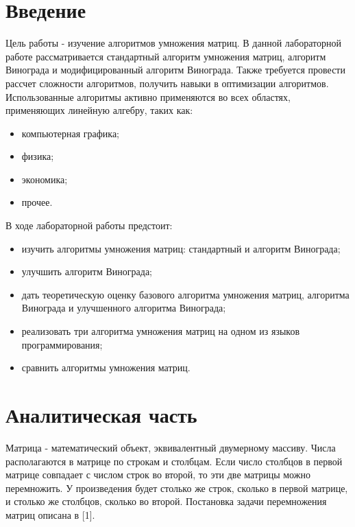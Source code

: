 \documentclass[12pt]{report}
\begin{document}



\tableofcontents

\newpage
\chapter*{Введение}
Цель работы - изучение алгоритмов умножения матриц. В данной лабораторной работе рассматривается стандартный алгоритм умножения матриц, алгоритм Винограда и модифицированный алгоритм Винограда. Также требуется провести рассчет сложности алгоритмов, получить навыки в оптимизации алгоритмов.
Использованные алгоритмы активно применяются во всех областях, применяющих линейную алгебру, таких как:
\begin{itemize}
	\item компьютерная графика;
	\item физика;
	\item экономика;
	\item прочее.
\end{itemize}

В ходе лабораторной работы предстоит:
\begin{itemize}
	\item изучить алгоритмы умножения матриц: стандартный и алгоритм Винограда;
	\item улучшить алгоритм Винограда;
	\item дать теоретическую оценку базового алгоритма умножения матриц, алгоритма Винограда и улучшенного алгоритма Винограда;
	\item реализовать три алгоритма умножения матриц на одном из языков программирования;
	\item сравнить алгоритмы умножения матриц.
\end{itemize}





\chapter{Аналитическая часть}
Матрица - математический объект, эквивалентный двумерному массиву. Числа располагаются в матрице по строкам и столбцам. Если число столбцов в первой матрице совпадает с числом строк во второй, то эти две матрицы можно перемножить. У произведения будет столько же строк, сколько в первой матрице, и столько же столбцов, сколько во второй. Постановка задачи перемножения матриц описана в [1].
	    
\end{document}
